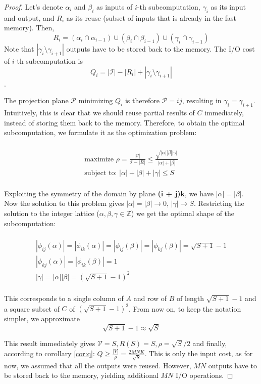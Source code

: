\documentclass[sigplan,review,anonymous]{acmart}\settopmatter{printfolios=true,printccs=false,printacmref=false}
\begin{document}
\begin{proof}
Let's denote $\alpha_i$ and $\beta_i$ as inputs of $i$-th 
subcomputation, $\gamma_i$ as its input and output, and $R_i$ as its reuse 
(subset of inputs that is already in the fast memory). Then, 
$$R_i = (\alpha_i \cap \alpha_{i-1}) \cup (\beta_i \cap \beta_{i-1}) \cup 
(\gamma_i \cap \gamma_{i-1}) $$
Note that $|\gamma_i \setminus \gamma_{i+1}|$ outputs have to be stored back to 
the memory. The I/O cost of $i$-th subcomputation is 
$$Q_i = |\mathcal{I}| - |R_i| + |\gamma_i \setminus \gamma_{i+1}|$$.

The projection plane $\mathcal{P}$ minimizing $Q_i$ is therefore $\mathcal{P} = 
ij$, resulting in $\gamma_i = \gamma_{i+1}$. Intuitively, 
this is clear that we should reuse partial results of $C$ immediately, instead 
of storing them back to the memory. Therefore, to obtain the optimal 
subcomputation, we formulate it as the optimization problem:

\begin{multline}
\\
\text{maximize } \rho = \frac{|\mathcal{V}|}{\mathcal{I} - |R|} \le 
\frac{\sqrt{|\alpha| |\beta| |\gamma|}}{|\alpha| + |\beta|}\\
\text{subject to: } |\alpha| + |\beta| + |\gamma| \le S \\
\end{multline}

Exploiting the symmetry of the domain by plane \textbf{(i + j)k}, we have  
$|\alpha| = |\beta|$. Now the solution to this problem gives $|\alpha| = 
|\beta| \rightarrow 0$, $|\gamma| \rightarrow S$.  
Restricting the solution to the integer lattice ($\alpha, \beta, \gamma \in 
\mathbb{Z}$) we get the optimal shape of the subcomputation:

\begin{multline}
\\
|\phi_{ij}(\alpha)| = |\phi_{ik}(\alpha)|  = |\phi_{ij}(\beta)| = 
|\phi_{kj}(\beta)|= \sqrt{S + 1} - 1 \\
|\phi_{kj}(\alpha)| = |\phi_{ik}(\beta)| = 1 \\
|\gamma| = |\alpha| |\beta| = (\sqrt{S + 1} - 1)^2 \\
\end{multline}

This corresponds to a single column of $A$ and row of $B$ of length $\sqrt{S + 
1} - 1$ and a square subset of $C$ of $(\sqrt{S + 1} - 1)^2$. From now on, to 
keep the notation simpler, we approximate 
$$\sqrt{S + 1} - 1 \approx \sqrt{S}$$

This result immediately gives $\mathcal{V} = S, R(S) = S, \rho = 
\sqrt{S}/2$ and finally, according to corollary \ref{cor:q}:  $Q \ge 
\frac{|V|}{\rho} = 
\frac{2MNK}{\sqrt{S}}$. This is only the input cost, as for now, we assumed 
that all the outputs were reused. However, $MN$ outputs have to be stored back 
to the memory, yielding additional $MN$ I/O operations.
\end{proof}
\end{document}
